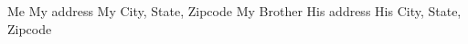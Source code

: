 \documentclass{article}
\begin{document}
\begin{labels}
Me
My address
My City, State, Zipcode
My Brother
His address
His City, State, Zipcode
\end{labels}
\end{document}
